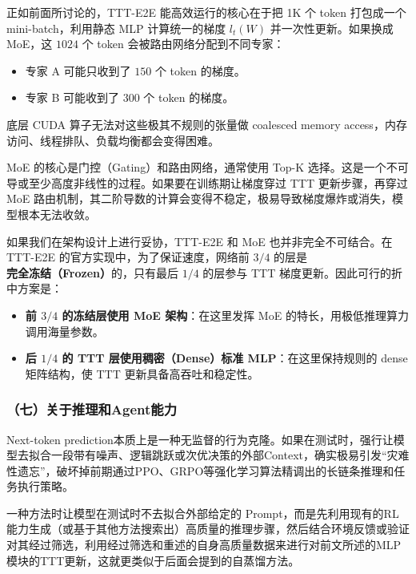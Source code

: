 正如前面所讨论的，TTT-E2E 能高效运行的核心在于把 1K 个 token 打包成一个 mini-batch，利用静态 MLP 计算统一的梯度 \(l_t(W)\) 并一次性更新。如果换成 MoE，这 \(1024\) 个 token 会被路由网络分配到不同专家：

\begin{itemize}
\tightlist
\item
  专家 A 可能只收到了 \(150\) 个 token 的梯度。
\item
  专家 B 可能收到了 \(300\) 个 token 的梯度。
\end{itemize}

底层 CUDA 算子无法对这些极其不规则的张量做 coalesced memory access，内存访问、线程排队、负载均衡都会变得困难。

MoE 的核心是门控（Gating）和路由网络，通常使用 Top-K 选择。这是一个不可导或至少高度非线性的过程。如果要在训练期让梯度穿过 TTT 更新步骤，再穿过 MoE 路由机制，其二阶导数的计算会变得不稳定，极易导致梯度爆炸或消失，模型根本无法收敛。

如果我们在架构设计上进行妥协，TTT-E2E 和 MoE 也并非完全不可结合。在 TTT-E2E 的官方实现中，为了保证速度，网络前 \(3/4\) 的层是\textbf{完全冻结（Frozen）}的，只有最后 \(1/4\) 的层参与 TTT 梯度更新。因此可行的折中方案是：

\begin{itemize}
\tightlist
\item
  \textbf{前 \(3/4\) 的冻结层使用 MoE 架构}：在这里发挥 MoE 的特长，用极低推理算力调用海量参数。
\item
  \textbf{后 \(1/4\) 的 TTT 层使用稠密（Dense）标准 MLP}：在这里保持规则的 dense 矩阵结构，使 TTT 更新具备高吞吐和稳定性。
\end{itemize}

\hypertarget{ux4e03ux5173ux4e8eux63a8ux7406ux548cagentux80fdux529b}{%
\subsubsection{（七）关于推理和Agent能力}\label{ux4e03ux5173ux4e8eux63a8ux7406ux548cagentux80fdux529b}}

Next-token prediction本质上是一种无监督的行为克隆。如果在测试时，强行让模型去拟合一段带有噪声、逻辑跳跃或次优决策的外部Context，确实极易引发``灾难性遗忘''，破坏掉前期通过PPO、GRPO等强化学习算法精调出的长链条推理和任务执行策略。

一种方法时让模型在测试时不去拟合外部给定的 Prompt，而是先利用现有的RL能力生成（或基于其他方法搜索出）高质量的推理步骤，然后结合环境反馈或验证对其经过筛选，利用经过筛选和重述的自身高质量数据来进行对前文所述的MLP模块的TTT更新，这就更类似于后面会提到的自蒸馏方法。

